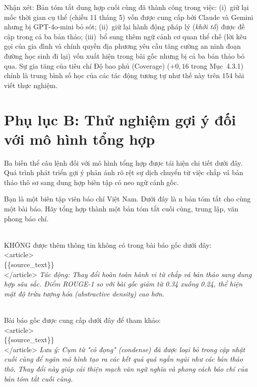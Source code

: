 Nhận xét: Bản tóm tắt dung hợp cuối cùng đã thành công trong việc: (i)~giữ lại mốc thời gian cụ thể (chiều 11 tháng 5) vốn được cung cấp bởi Claude và Gemini nhưng bị GPT-4o-mini bỏ sót; (ii)~giữ lại hành động pháp lý (\textit{khởi tố}) được đề cập trong cả ba bản thảo; (iii)~bổ sung thêm ngữ cảnh cơ quan thể chế (lời kêu gọi của gia đình và chính quyền địa phương yêu cầu tăng cường an ninh đoạn đường học sinh đi lại) vốn xuất hiện trong bài gốc nhưng bị cả ba bản thảo bỏ qua. Sự gia tăng của tiêu chí Độ bao phủ (Coverage) ($+0,16$ trong Mục~4.3.1) chính là trung bình số học của các tác động tương tự như thế này trên $154$ bài viết thực nghiệm.

\section*{Phụ lục B: Thử nghiệm gợi ý đối với mô hình tổng hợp}

Ba biến thể câu lệnh đối với mô hình tổng hợp được tái hiện chi tiết dưới đây. Quá trình phát triển gợi ý phản ánh rõ rệt sự dịch chuyển từ việc chắp vá bản thảo thô sơ sang dung hợp biên tập có neo ngữ cảnh gốc.

\begin{tcolorbox}[title=Biến thể cơ sở (Chỉ chắp vá bản thảo), colback=gray!5!white, colframe=gray!75!black, breakable, fontupper=\small\ttfamily]
Bạn là một biên tập viên báo chí Việt Nam. Dưới đây là n bản tóm tắt cho cùng một bài báo. Hãy tổng hợp thành một bản tóm tắt cuối cùng, trung lập, văn phong báo chí.
\end{tcolorbox}

\begin{tcolorbox}\\
KHÔNG được thêm thông tin không có trong bài báo gốc dưới đây:\\
<article>\\
\{\{source\_text\}\}\\
</article>
\tcblower
\textit{Tác động: Thay đổi hoàn toàn hành vi từ chắp vá bản thảo sang dung hợp sâu sắc. Điểm ROUGE-1 so với bài gốc giảm từ 0.34 xuống 0.24, thể hiện mật độ trừu tượng hóa (abstractive density) cao hơn.}
\end{tcolorbox}

\begin{tcolorbox}\\
Bài báo gốc được cung cấp dưới đây để tham khảo:\\
<article>\\
\{\{source\_text\}\}\\
</article>
\tcblower
\textit{Lưu ý: Cụm từ "cô đọng" (condense) đã được loại bỏ trong cập nhật cuối cùng để ngăn mô hình tạo ra các kết quả quá ngắn ngủi như các bản thảo thô. Thay đổi này giúp cải thiện mạch văn ngữ nghĩa và phong cách báo chí của bản tóm tắt cuối cùng.}
\end{tcolorbox}

